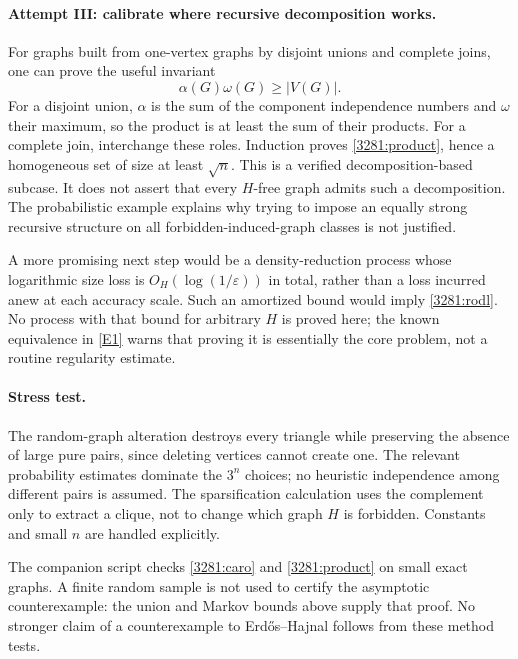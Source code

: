 \documentclass[11pt,a4paper]{article}
\newcommand{\eref}[2]{\hyperlink{extra:#1:#2}{[E#2]}}
\numberwithin{equation}{section}
\begin{document}
\paragraph{Attempt III: calibrate where recursive decomposition works.}
For graphs built from one-vertex graphs by disjoint unions and complete
joins, one can prove the useful invariant
\begin{equation}\label{3281:product}
 \alpha(G)\omega(G)\geq|V(G)|.
\end{equation}
For a disjoint union, $\alpha$ is the sum of the component independence
numbers and $\omega$ their maximum, so the product is at least the
sum of their products.  For a complete join, interchange these roles.
Induction proves \eqref{3281:product}, hence a homogeneous set of size
at least $\sqrt n$.  This is a verified decomposition-based subcase.
It does not assert that every $H$-free graph admits such a decomposition.
The probabilistic example explains why trying to impose an equally
strong recursive structure on all forbidden-induced-graph classes is
not justified.

A more promising next step would be a density-reduction process whose
logarithmic size loss is $O_H(\log(1/\varepsilon))$ in total, rather
than a loss incurred anew at each accuracy scale.  Such an amortized
bound would imply \eqref{3281:rodl}.  No process with that bound for
arbitrary $H$ is proved here; the known equivalence in \eref{3281}{1}
warns that proving it is essentially the core problem, not a routine
regularity estimate.

\paragraph{Stress test.}
The random-graph alteration destroys every triangle while preserving
the absence of large pure pairs, since deleting vertices cannot create
one.  The relevant probability estimates dominate the $3^n$ choices;
no heuristic independence among different pairs is assumed.  The
sparsification calculation uses the complement only to extract a
clique, not to change which graph $H$ is forbidden.  Constants and small
$n$ are handled explicitly.

The companion script checks \eqref{3281:caro} and
\eqref{3281:product} on small exact graphs.  A finite random sample is
not used to certify the asymptotic counterexample: the union and Markov
bounds above supply that proof.  No stronger claim of a counterexample
to Erd\H{o}s--Hajnal follows from these method tests.
\end{document}
